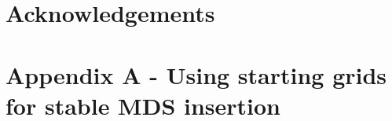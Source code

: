 \documentclass[useAMS,referee]{biom}
\begin{document}
%




\section*{Acknowledgements}



\section*{Appendix A - Using starting grids for stable MDS insertion}
\end{document}

